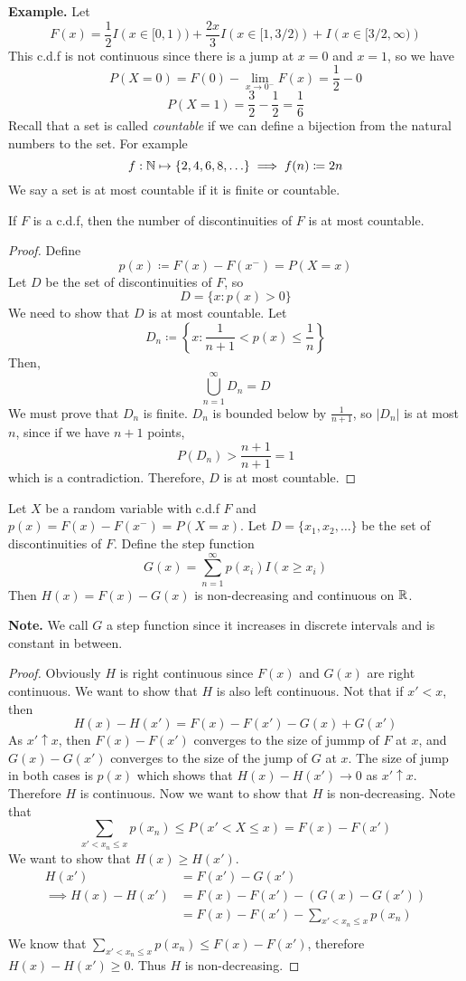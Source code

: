 \noindent
\textbf{Example.} Let 
\[F(x) = \frac{1}{2}I(x \in [0,1)) + \frac{2x}{3}I\left(x \in [1, 3/2)\right) + I\left(x \in [3/2, \infty)\right)\]
This c.d.f is not continuous since there is a jump at $x = 0$ and $x = 1$, so we have 
\[P(X = 0) = F(0) - \lim_{x\rightarrow 0^-} F(x) = \frac{1}{2} - 0\]
\[P(X = 1) = \frac{3}{2} - \frac{1}{2} = \frac{1}{6}\]
Recall that a set is called \emph{countable} if we can define a bijection from the natural numbers to the set. For example 
\[f:\mathbb{N} \mapsto \{2,4,6,8,\ldots\}  \implies f(n) \coloneqq 2n\]
We say a set is at most countable if it is finite or countable. 
\begin{lemma}
    If $F$ is a c.d.f, then the number of discontinuities of $F$ is at most countable.
\end{lemma}
\begin{proof}
    Define 
    \[p(x) \coloneqq F(x) - F(x^-) = P(X = x)\]
    Let $D$ be the set of discontinuities of $F$, so 
    \[D = \{x: p(x) > 0\}\]
    We need to show that $D$ is at most countable. Let 
    \[D_n \coloneqq \left\{x: \frac{1}{n+1} < p(x) \leq \frac{1}{n}\right\}\]
    Then, 
    \[\bigcup_{n=1}^\infty D_n = D\]
    We must prove that $D_n$ is finite. $D_n$ is bounded below by $\frac{1}{n+1}$, so $|D_n|$ is at most $n$, since if we have $n+1$ points, 
    \[P(D_n) > \frac{n+1}{n+1} = 1\]
    which is a contradiction. Therefore, $D$ is at most countable.
\end{proof}
\begin{lemma}
    Let $X$ be a random variable with c.d.f $F$ and $p(x) = F(x) - F(x^-) = P(X=x)$. Let $D = \{x_1,x_2, \ldots\} $ be the set of discontinuities of $F$. Define the step function 
    \[G(x) = \sum_{n=1}^\infty p(x_i)I(x \geq x_i)\]
    Then $H(x) = F(x) - G(x)$ is non-decreasing and continuous on $\mathbb{R}$.
\end{lemma}
\textbf{Note.} We call $G$ a step function since it increases in discrete intervals and is constant in between. \\[2ex]
\begin{proof}
    Obviously $H$ is right continuous since $F(x)$ and $G(x)$ are right continuous. We want to show that $H$ is also left continuous. Not that if $x' < x$, then 
    \[H(x) - H(x') = F(x) - F(x') - G(x) + G(x')\]
    As $x' \uparrow x$, then $F(x) - F(x')$ converges to the size of jummp of $F$ at $x$, and $G(x) - G(x')$ converges to the size of the jump of $G$ at $x$. The size of jump in both cases is $p(x)$ which shows that $H(x) - H(x') \rightarrow 0$ as $x'\uparrow x$. Therefore $H$ is continuous. Now we want to show that $H$ is non-decreasing. Note that
    \[\sum_{x' < x_n \leq x} p(x_n)\leq P(x' < X \leq x) = F(x) - F(x')\]
    We want to show that $H(x) \geq H(x')$.
    \begin{align*}
        H(x') &= F(x') - G(x')\\
        \implies H(x) - H(x') &= F(x) - F(x') - (G(x) - G(x'))\\
        &= F(x) - F(x') - \sum_{x' < x_n \leq x} p(x_n)\\ 
    \end{align*}    
    We know that $\sum\limits_{x' < x_n \leq x} p(x_n) \leq F(x) - F(x')$, therefore $H(x) - H(x') \geq 0$. Thus $H$ is non-decreasing. 
\end{proof}
